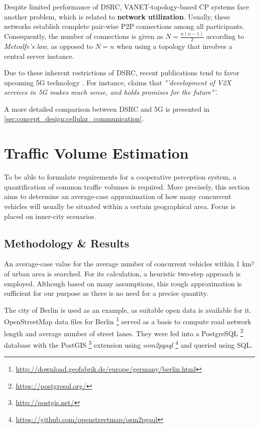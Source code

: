 Despite limited performance of DSRC, VANET-topology-based CP systems face another problem, which is related to \textbf{network utilization}. Usually, these networks establish complete pair-wise P2P connections among all participants. Consequently, the number of connections is given as $N = \frac{n(n-1)}{2 }$ according to \textit{Metcalfe's law}, as opposed to $N = n$ when using a topology that involves a central server instance.

Due to these inherent restrictions of DSRC, recent publications tend to favor upcoming 5G technology \cite{Briegleb2019, 5GAutomotiveAssociation2016}. For instance, \cite{Wevers2017} claims that \textit{"'development of V2X services in 5G makes much sense, and holds promises for the future"'}.

A more detailed comparison between DSRC and 5G is presented in \autoref{sec:concept_design:cellular_communication}.

\section{Traffic Volume Estimation}
\label{sec:problem_analysis:traffic_volume_estimation}

To be able to formulate requirements for a cooperative perception system, a quantification of common traffic volumes is required. More precisely, this section aims to determine an average-case approximation of how many concurrent vehicles will usually be situated within a certain geographical area. Focus is placed on inner-city scenarios. 

\subsection{Methodology \& Results}
\label{subsec:problem_analysis:methodology_results}
An average-case value for the average number of concurrent vehicles within 1 km² of urban area is searched. For its calculation, a heuristic two-step approach is employed. Although based on many assumptions, this rough approximation is sufficient for our purpose as there is no need for a precise quantity. 

The city of Berlin is used as an example, as suitable open data is available for it. OpenStreetMap data files for Berlin \footnote{\url{http://download.geofabrik.de/europe/germany/berlin.html}} served as a basis to compute road network length and average number of street lanes. They were fed into a PostgreSQL \footnote{\url{https://postgresql.org/}} database with the PostGIS \footnote{\url{http://postgis.net/}} extension using \textit{osm2pgsql} \footnote{\url{https://github.com/openstreetmap/osm2pgsql}} and queried using SQL.

